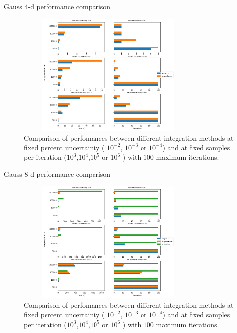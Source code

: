 \documentclass[t,handout,professionalfonts]{beamer}
\begin{document}
\begin{frame}{Gauss 4-d performance comparison}
	\tiny
	\vspace{-0.4cm}
	\begin{figure}
		\includegraphics[height=6cm,width=9cm]{../performance_plots/gauss4-d_no_stratified.png}
		\caption{Comparison of perfomances between different integration methods at fixed percent uncertainty ( $10^{-2}$, $10^{-3}$ or $10^{-4}$) and at fixed samples per iteration ($10^3$,$10^4$,$10^5$ or $10^6$ ) with $100$ maximum iterations.}
	\end{figure}
	
\end{frame}

\begin{frame}{Gauss 8-d performance comparison}
	\tiny
	\vspace{-0.4cm}
	\begin{figure}
		\includegraphics[height=6cm,width=9cm]{../performance_plots/gauss8-d.png}
		\caption{Comparison of perfomances between different integration methods at fixed percent uncertainty ( $10^{-2}$, $10^{-3}$ or $10^{-4}$) and at fixed samples per iteration ($10^3$,$10^4$,$10^5$ or $10^6$ ) with $100$ maximum iterations.}
	\end{figure}
	
\end{frame}
\end{document}
